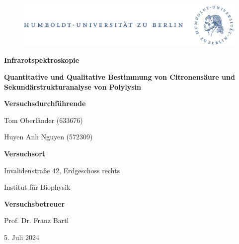 \documentclass[10pt,a4paper]{article}
\begin{document}
	
	\begin{titlepage}
		\begin{center}
			\begin{figure}[h!tbp]
				\includegraphics[width=\linewidth]{HUlogo.PNG}
			\end{figure}
			\vspace*{2 cm}
			
			\textcolor{Bluetitle}{\textbf{\huge Infrarotspektroskopie}}\par
			\vspace*{0.5cm}
			\textcolor{softbluetitle}{\textbf{\Large Quantitative und Qualitative Bestimmung von Citronensäure und Sekundärstrukturanalyse von Polylysin}}\par
			
			\vspace*{2cm}
			
			\textcolor{Greyish}{\textbf{Versuchsdurchführende}}\par
			\textcolor{Greyish}{Tom Oberländer (633676)}\par
			\textcolor{Greyish}{Huyen Anh Nguyen (572309)}\par
			
			\vspace*{0.5cm}
			\textcolor{Greyish}{\textbf{Versuchsort}}\par
			\textcolor{Greyish}{Invalidenstraße 42, Erdgeschoss rechts}\par
			\textcolor{Greyish}{Institut für Biophysik}\par
			\vspace*{0.5cm}
			\textcolor{Greyish}{\textbf{Versuchsbetreuer}}\par
			\textcolor{Greyish}{Prof. Dr. Franz Bartl}\par
			
			\vspace*{2 cm}
			
			\textcolor{Greyish}{5. Juli 2024}\par
			
			
			
			
		\end{center}
	\end{titlepage}
	
	\tableofcontents
	
\end{document}
